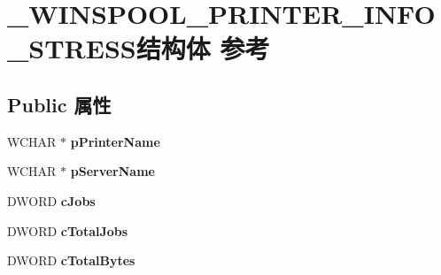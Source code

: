 \hypertarget{struct___w_i_n_s_p_o_o_l___p_r_i_n_t_e_r___i_n_f_o___s_t_r_e_s_s}{}\section{\+\_\+\+W\+I\+N\+S\+P\+O\+O\+L\+\_\+\+P\+R\+I\+N\+T\+E\+R\+\_\+\+I\+N\+F\+O\+\_\+\+S\+T\+R\+E\+S\+S结构体 参考}
\label{struct___w_i_n_s_p_o_o_l___p_r_i_n_t_e_r___i_n_f_o___s_t_r_e_s_s}
\subsection*{Public 属性}
\begin{DoxyCompactItemize}
\item 
\mbox{\label{struct___w_i_n_s_p_o_o_l___p_r_i_n_t_e_r___i_n_f_o___s_t_r_e_s_s_a9a8abfb63d3dcb98069328e5b7bb4aed}} 
W\+C\+H\+AR $\ast$ {\bfseries p\+Printer\+Name}
\item 
\mbox{\label{struct___w_i_n_s_p_o_o_l___p_r_i_n_t_e_r___i_n_f_o___s_t_r_e_s_s_acfeef5955d75706de1e34ac06ff713b2}} 
W\+C\+H\+AR $\ast$ {\bfseries p\+Server\+Name}
\item 
\mbox{\label{struct___w_i_n_s_p_o_o_l___p_r_i_n_t_e_r___i_n_f_o___s_t_r_e_s_s_ae1486a2a400e2d5dd3723289de14082f}} 
D\+W\+O\+RD {\bfseries c\+Jobs}
\item 
\mbox{\label{struct___w_i_n_s_p_o_o_l___p_r_i_n_t_e_r___i_n_f_o___s_t_r_e_s_s_a277eb0abf40fd05c573afe8372dec236}} 
D\+W\+O\+RD {\bfseries c\+Total\+Jobs}
\item 
\mbox{\label{struct___w_i_n_s_p_o_o_l___p_r_i_n_t_e_r___i_n_f_o___s_t_r_e_s_s_a032f7016ccba8f24501e38cf9624a6f8}} 
D\+W\+O\+RD {\bfseries c\+Total\+Bytes}
\item 
\mbox{\label{struct___w_i_n_s_p_o_o_l___p_r_i_n_t_e_r___i_n_f_o___s_t_r_e_s_s_a907acd5071f84bf473629b03756ff534}} 

\end{DoxyCompactItemize}

